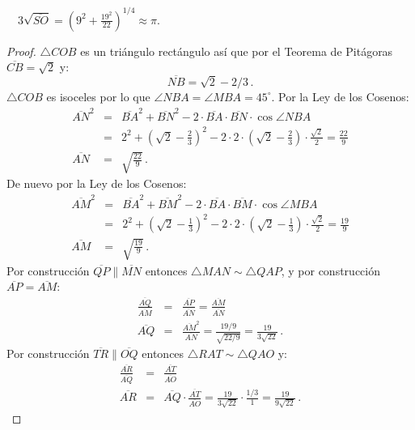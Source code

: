 \begin{theorem}\label{thm.ramanujan2}
$\quad 3\sqrt{\overline{SO}}=\left(9^2+\displaystyle\frac{19^2}{22}\right)^{1/4}\approx \pi$.
\end{theorem}
\begin{proof}
$\triangle COB$ es un triángulo rectángulo así que por el Teorema de Pitágoras $\overline{CB}=\sqrt{2}$ y:
\[
\overline{NB}=\sqrt{2}-2/3\,.
\]
$\triangle COB$ es isoceles por lo que $\angle NBA =\angle MBA=45^\circ$. Por la Ley de los Cosenos:
\begin{eqnarray*}
\overline{AN}^2&=&\overline{BA}^2 + \overline{BN}^2-2\cdot\overline{BA}\cdot\overline{BN}\cdot\cos \angle NBA\\
&=&2^2+\left(\sqrt{2}-\frac{2}{3}\right)^2-2\cdot 2 \cdot \left(\sqrt{2}-\frac{2}{3}\right)\cdot \frac{\sqrt{2}}{2}
=\frac{22}{9}\\
\overline{AN}&=&\sqrt{\frac{22}{9}}\,.
\end{eqnarray*}
De nuevo por la Ley de los Cosenos:
\begin{eqnarray*}
\overline{AM}^2&=&\overline{BA}^2 + \overline{BM}^2-2\cdot\overline{BA}\cdot\overline{BM}\cdot\cos \angle MBA\\
&=&2^2+\left(\sqrt{2}-\frac{1}{3}\right)^2-2\cdot 2 \cdot \left(\sqrt{2}-\frac{1}{3}\right)\cdot \frac{\sqrt{2}}{2}
=\frac{19}{9}\\
\overline{AM}&=&\sqrt{\frac{19}{9}}\,.
\end{eqnarray*}
Por construcción $\overline{QP}\parallel \overline{MN}$ entonces
$\triangle MAN\sim \triangle QAP$, y por construcción $\overline{AP}=\overline{AM}$:
\begin{eqnarray*}
\frac{\overline{AQ}}{\overline{AM}}&=&\frac{\overline{AP}}{\overline{AN}}=\frac{\overline{AM}}{\overline{AN}}\\
\overline{AQ}&=&\frac{\overline{AM}^2}{\overline{AN}}=\frac{19/9}{\sqrt{22/9}}=\frac{19}{3\sqrt{22}}\,.
\end{eqnarray*}
Por construcción $\overline{TR}\parallel \overline{OQ}$ entonces
$\triangle RAT\sim \triangle QAO$ y:
\begin{eqnarray*}
\frac{\overline{AR}}{\overline{AQ}}&=&\frac{\overline{AT}}{\overline{AO}}\\
\overline{AR}&=&\overline{AQ}\cdot\frac{\overline{AT}}{\overline{AO}}=\frac{19}{3\sqrt{22}}\cdot\frac{1/3}{1}=\frac{19}{9\sqrt{22}}\,.
\end{eqnarray*}




\end{proof}
